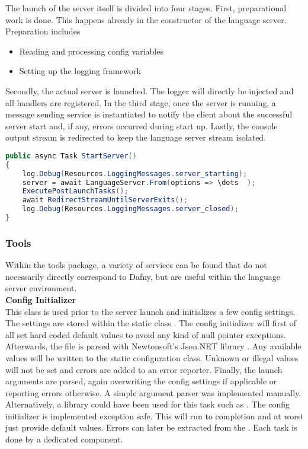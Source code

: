 The launch of the server itself is divided into four stages.
First, preparational work is done.
This happens already in the constructor of the language server.
Preparation includes
\begin{itemize}
    \item Reading and processing config variables
    \item Setting up the logging framework
\end{itemize}
Secondly, the actual server is launched.
The logger will directly be injected and all handlers are registered.
In the third stage, once the server is running, a message sending service is instantiated to notify the client about the successful server start and, if any, errors occurred during start up.
Lastly, the console output stream is redirected to keep the language server stream isolated.

\begin{lstlisting}[language=csharp, caption={Starting the Language Server}, captionpos=b, label={lst:serverstart}]
public async Task StartServer()
{
    log.Debug(Resources.LoggingMessages.server_starting);
    server = await LanguageServer.From(options => \dots  );
    ExecutePostLaunchTasks();
    await RedirectStreamUntilServerExits();
    log.Debug(Resources.LoggingMessages.server_closed);
}
\end{lstlisting}

\subsubsection{Tools}
Within the tools package,
a variety of services can be found that do not necessarily directly correspond to Dafny,
but are useful within the language server environment.\\

\textbf{Config Initializer}\\
This class is used prior to the server launch and initializes a few config settings.
The settings are stored within the static class .
The config initializer will first of all set hard coded default values to avoid any kind of null pointer exceptions.
Afterwards, the file  is parsed with Newtonsoft's Json.NET library \cite{jsondotnet}.
Any available values will be written to the static configuration class.
Unknown or illegal values will not be set and errors are added to an error reporter.
Finally, the launch arguments are parsed, again overwriting the config settings if applicable or reporting errors otherwise.
A simple argument parser was implemented manually.
Alternatively, a library could have been used for this task such as \cite{clparser}.
The config initializer is implemented exception safe.
This will run to completion and at worst just provide default values.
Errors can later be extracted from the .
Each task is done by a dedicated component.\\

